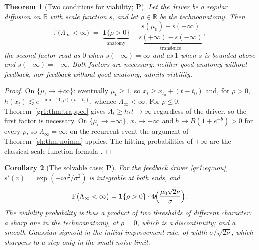 \documentclass[11pt]{article}
\numberwithin{equation}{section}
\theoremstyle{plain}
\newtheorem{theorem}{Theorem}[section]
\newtheorem{corollary}[theorem]{Corollary}
\theoremstyle{definition}
\theoremstyle{remark}
\newcommand{\PP}{\mathbb{P}}
\newcommand{\R}{\mathbb{R}}
\newcommand{\one}{\mathbf{1}}
\begin{document}
\begin{theorem}[Two conditions for viability; \textbf{P}]
\label{gr1:thm:twocond}
Let the driver be a regular diffusion on $\R$ with scale function $s$,
and let $\rho\in\R$ be the technoanatomy. Then
\begin{equation}\label{gr1:eq:twocond}
\PP\bigl(\Lambda_\infty<\infty\bigr)
\;=\;
\underbrace{\one\{\rho>0\}}_{\text{anatomy}}
\;\cdot\;
\underbrace{\frac{s(\mu_0)-s(-\infty)}{s(+\infty)-s(-\infty)}}
_{\text{transience}},
\end{equation}
the second factor read as $0$ when $s(+\infty)=\infty$ and as $1$ when
$s$ is bounded above and $s(-\infty)=-\infty$. Both factors are
necessary: neither good anatomy without feedback, nor feedback without
good anatomy, admits viability.
\end{theorem}

\begin{proof}
On $\{\mu_t\to+\infty\}$: eventually $\mu_t\ge1$, so $x_t\ge x_{t_0}+
(t-t_0)$ and, for $\rho>0$, $h(x_t)\lesssim e^{-\min(1,\rho)(t-t_0)}$,
whence $\Lambda_\infty<\infty$. For $\rho\le0$,
Theorem~\ref{gr1:thm:trapped} gives $\Lambda_t\ge h_\ast t\to\infty$
regardless of the driver, so the first factor is necessary. On
$\{\mu_t\to-\infty\}$, $x_t\to-\infty$ and $h\to B(1+e^{-b})>0$ for
every $\rho$, so $\Lambda_\infty=\infty$; on the recurrent event the
argument of Theorem~\ref{sh:thm:noimm} applies. The hitting
probabilities of $\pm\infty$ are the classical scale-function formula
\cite{KT81,RY99}.
\end{proof}

\begin{corollary}[The solvable case; \textbf{P}]\label{gr1:cor:solvable}
For the feedback driver \eqref{gr1:eq:uou},
$s'(v)=\exp(-\nu v^{2}/\sigma^{2})$ is integrable at both ends, and
\begin{equation}\label{gr1:eq:sigmoid}
\PP\bigl(\Lambda_\infty<\infty\bigr)
=\one\{\rho>0\}\cdot\Phi\!\Bigl(\frac{\mu_0\sqrt{2\nu}}{\sigma}\Bigr).
\end{equation}
The viability probability is thus a \emph{product of two thresholds of
different character}: a sharp one in the technoanatomy, at $\rho=0$,
which is a discontinuity; and a smooth Gaussian sigmoid in the initial
improvement rate, of width $\sigma/\sqrt{2\nu}$, which sharpens to a
step only in the small-noise limit.
\end{corollary}
\end{document}
